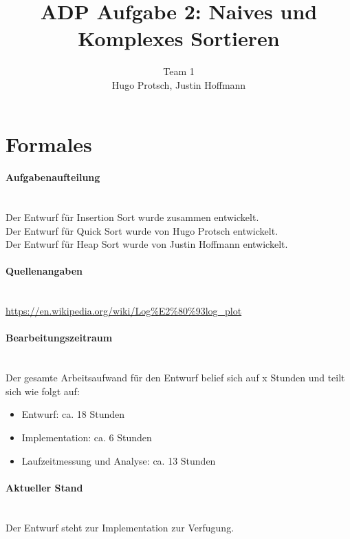 \documentclass[11pt]{article}
\title{ADP Aufgabe 2: Naives und Komplexes Sortieren}
\author{Team 1\\Hugo Protsch, Justin Hoffmann}
\begin{document}
    \maketitle

    \tableofcontents

    \newpage


    \section{Formales}\label{sec:Formales}

    \paragraph*{Aufgabenaufteilung}\mbox{}\\
    Der Entwurf für Insertion Sort wurde zusammen entwickelt.\\
    Der Entwurf für Quick Sort wurde von Hugo Protsch entwickelt.\\
    Der Entwurf für Heap Sort wurde von Justin Hoffmann entwickelt.

    \paragraph*{Quellenangaben}\mbox{}\\
    \url{https://en.wikipedia.org/wiki/Log%
    }

    \paragraph*{Bearbeitungszeitraum}\mbox{}\\
    Der gesamte Arbeitsaufwand für den Entwurf belief sich auf x Stunden%
    und teilt sich wie folgt auf:
    \begin{itemize}
        \setlength\itemsep{0em}
        \item Entwurf: ca. 18 Stunden
        \item Implementation: ca. 6 Stunden %
        \item Laufzeitmessung und Analyse: ca. 13 Stunden
    \end{itemize}

    \paragraph*{Aktueller Stand}\mbox{}\\
    Der Entwurf steht zur Implementation zur Verfugung.
\end{document}
